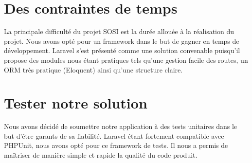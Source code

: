 \section{Des contraintes de temps}

La principale difficulté du projet SOSI est la durée allouée à la réalisation du projet.
Nous avons opté pour un framework dans le but de gagner en temps de développement. Laravel
s'est présenté comme une solution convenable puisqu'il propose des modules nous étant pratiques
tels qu'une gestion facile des routes, un ORM très pratique (Eloquent) ainsi qu'une structure
claire.

\section{Tester notre solution}

Nous avons décidé de soumettre notre application à des tests unitaires dans le but d'être garants de sa fiabilité. Laravel étant fortement compatible avec PHPUnit, nous avons opté pour ce framework de tests. Il nous a permis de maîtriser de manière simple et rapide la qualité du code produit.
